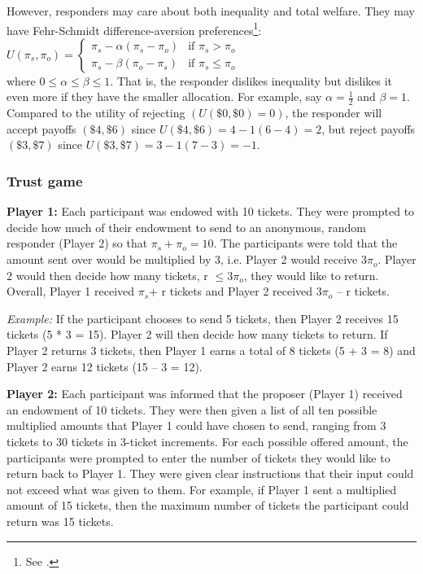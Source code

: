 \documentclass[12pt]{article}
\begin{document}
However, responders may care about both inequality and total welfare. They may have Fehr-Schmidt difference-aversion preferences\footnote{See \cite{fehr_schmidt_1999}.}:\\

$ U(\pi_{s}, \pi_{o})  = \begin{cases}
      \pi_{s} - \alpha(\pi_{s} - \pi_{o}) & \text{if }\pi_{s} > \pi_{o} \\
      \pi_{s} - \beta(\pi_{o} - \pi_{s}) & \text{if }\pi_{s} \leq \pi_{o}
    \end{cases}\, $ \\

\noindent where $ 0 \leq \alpha \leq \beta \leq 1$. That is, the responder dislikes inequality but dislikes it even more if they have the smaller allocation. For example, say $\alpha = \frac{1}{2}$ and $\beta=1$. Compared to the utility of rejecting \((U(\$0, \$0) = 0)\), the responder will accept payoffs \((\$4, \$6)\) since \(U(\$4, \$6) = 4 - 1(6 - 4) =  2\), but reject payoffs \((\$3, \$7)\) since \(U(\$3,  \$7) = 3 - 1(7 - 3) = -1\).

	
\subsubsection{Trust game}
\textbf{Player 1:} Each participant was endowed with 10 tickets. They were prompted to decide how much of their endowment to send to an anonymous, random responder (Player 2) so that \(\pi_{s} + \pi_{o} = 10\). The participants were told that the amount sent over would be multiplied by 3, i.e. Player 2 would receive 3\(\pi_{o}\). Player 2 would then decide how many tickets, r \(\leq 3\pi_{o}\), they would like to return. Overall, Player 1 received \(\pi_{s}\)+ r tickets and Player 2 received 3\(\pi_{o}\) -- r tickets.

\textit{Example:} If the participant chooses to send 5 tickets, then Player 2 receives 15 tickets (5 * 3 = 15). Player 2 will then decide how many tickets to return. If Player 2 returns 3 tickets, then Player 1 earns a total of 8 tickets (5 + 3 = 8) and Player 2 earns 12 tickets (15 -- 3 = 12).

\textbf{Player 2:} Each participant was informed that the proposer (Player 1) received an endowment of 10 tickets. They were then given a list of all ten possible multiplied amounts that Player 1 could have chosen to send, ranging from 3 tickets to 30 tickets in 3-ticket increments. For each possible offered amount, the participants were prompted to enter the number of tickets they would like to return back to Player 1. They were given clear instructions that their input could not exceed what was given to them. For example, if Player 1 sent a multiplied amount of 15 tickets, then the maximum number of tickets the participant could return was 15 tickets.
\end{document}
